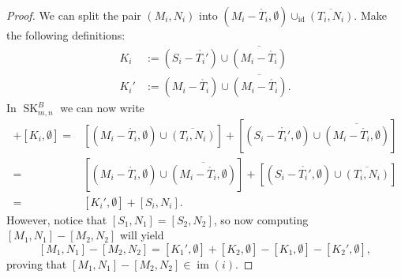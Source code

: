 \documentclass[10pt,a4paper]{amsart}
\newcommand{\SK}{\operatorname{SK}}
\newcommand{\im}{\operatorname{im}}
\begin{document}
\begin{proof}
    We can split the pair $(M_i, N_i)$ into $(M_i-\mathring{T_i},\emptyset) \cup_{\text{id}} \overline{(T_i, N_i)}$. Make the following definitions:
    \begin{align*}
        K_i &:= (S_i - \mathring{T_i'}) \cup \overline{(M_i-\mathring{T_i})} \\
        K_i' &:= (M_i-\mathring{T_i}) \cup \overline{(M_i-\mathring{T_i})}.
    \end{align*}
    In $\SK_{m,n}^B$ we can now write
    \begin{align*}
        [M_i, N_i] + [K_i, \emptyset]
        =& [(M_i-\mathring{T_i},\emptyset)\cup \overline{(T_i,N_i)}] + [(S_i-\mathring{T_i'},\emptyset)\cup \overline{(M_i-\mathring{T_i},\emptyset)}]\\
        =& [(M_i-\mathring{T_i},\emptyset)\cup\overline{(M_i-\mathring{T_i},\emptyset)}] + [(S_i-\mathring{T_i'},\emptyset)\cup\overline{(T_i,N_i)}]\\
        =& [K_i',\emptyset] + [S_i, N_i].
    \end{align*}
    \noindent
    However, notice that $[S_1, N_1] = [S_2, N_2]$, so now computing $[M_1, N_1] - [M_2, N_2]$ will yield
        \[[M_1, N_1] - [M_2, N_2]
        = [K_1', \emptyset] + [K_2, \emptyset] - [K_1,\emptyset] - [K_2', \emptyset],\]
    proving that $[M_1, N_1] - [M_2, N_2]\in \im(i)$.
\end{proof}
\end{document}
